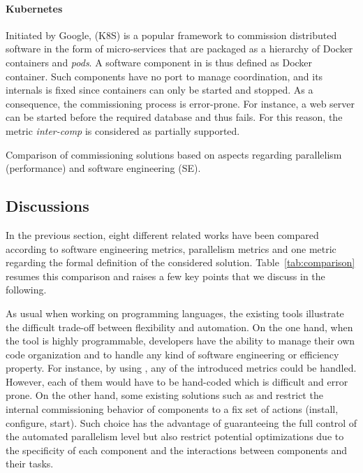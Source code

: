 \paragraph{Kubernetes}
Initiated by Google, \kubernetes (K8S) is a popular framework to
commission distributed software in the form of micro-services that are
packaged as a hierarchy of Docker containers and \emph{pods}. A
software component in \kubernetes is thus defined as Docker
container. Such components have no port to manage coordination, and
its internals is fixed since containers can only be started and
stopped. As a consequence, the commissioning process is
error-prone. For instance, a web server can be started before the
required database and thus fails. For this reason, the metric
\emph{inter-comp} is considered as partially supported.

\begin{table*}[tp]
  \centering
  \small
  
  \caption{Comparison of commissioning solutions based on aspects
  regarding parallelism (performance) and software engineering (SE).}
  \label{tab:comparison}
\end{table*}

\subsection{Discussions}

In the previous section, eight different related works have been
compared according to software engineering metrics, parallelism
metrics and one metric regarding the formal definition of the
considered solution. Table~\ref{tab:comparison} resumes this
comparison and raises a few key points that we discuss in the
following.

As usual when working on programming languages, the existing
tools illustrate the difficult trade-off between flexibility and
automation. On the one hand, when the tool is highly programmable,
developers have the ability to manage their own code organization and
to handle any kind of software engineering or efficiency property. For
instance, by using \shell, any of the introduced metrics could be
handled. However, each of them would have to be hand-coded which is
difficult and error prone. On the other hand, some existing solutions
such as \deployware and \juju restrict the internal commissioning
behavior of components to a fix set of actions (\eg install,
configure, start). Such choice has the advantage of guaranteeing the
full control of the automated parallelism level but also restrict
potential optimizations due to the specificity of each component and
the interactions between components and their tasks.

